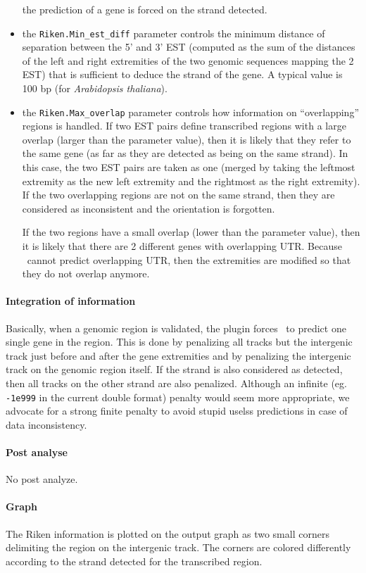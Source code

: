 \begin{itemize}
  the prediction of a gene is forced on the strand detected.
\item the \texttt{Riken.Min\_est\_diff} parameter controls the minimum
  distance of separation between the 5' and 3' EST (computed as the
  sum of the distances of the left and right extremities of the two
  genomic sequences mapping the 2 EST) that is sufficient to deduce
  the strand of the gene. A typical value is 100 bp (for
  \textit{Arabidopsis thaliana}).
\item the \texttt{Riken.Max\_overlap} parameter controls how
  information on ``overlapping'' regions is handled. If two EST pairs
  define transcribed regions with a large overlap (larger than the
  parameter value), then it is likely that they refer to the same gene
  (as far as they are detected as being on the same strand). In this
  case, the two EST pairs are taken as one (merged by taking the
  leftmost extremity as the new left extremity and the rightmost as
  the right extremity). If the two overlapping regions are not on the
  same strand, then they are considered as inconsistent and the
  orientation is forgotten.
  
  If the two regions have a small overlap (lower than the parameter
  value), then it is likely that there are 2 different genes with
  overlapping UTR. Because \EuGene\ cannot predict overlapping UTR,
  then the extremities are modified so that they do not overlap
  anymore.
\end{itemize}

\paragraph{Integration of information}

Basically, when a genomic region is validated, the plugin forces
\EuGene\ to predict one single gene in the region. This is done by
penalizing all tracks but the intergenic track just before and after
the gene extremities and by penalizing the intergenic track on the
genomic region itself. If the strand is also considered as detected,
then all tracks on the other strand are also penalized.  Although an
infinite (eg. \texttt{-1e999} in the current double format) penalty
would seem more appropriate, we advocate for a strong finite penalty
to avoid stupid uselss predictions in case of data inconsistency.

\paragraph{Post analyse}

No post analyze.

\paragraph{Graph}

The Riken information is plotted on the output graph as two small
corners delimiting the region on the intergenic track. The corners are
colored differently according to the strand detected for the
transcribed region.





